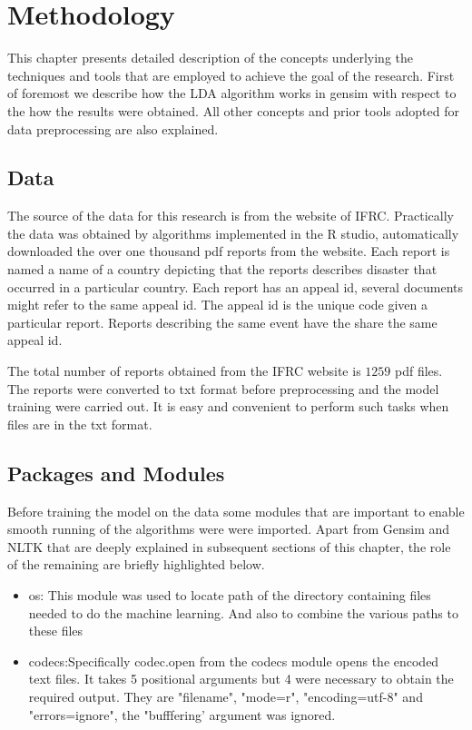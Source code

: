 \chapter{Methodology}
This chapter presents detailed description  of the concepts underlying the techniques and tools that are employed to achieve the goal of the research. First of foremost we describe how the LDA algorithm works in gensim with respect to the how the results were obtained. All other concepts and prior tools adopted for data preprocessing are also explained.

\section{Data}
\begin{flushleft}
The source of the data for this research is from the website of IFRC. Practically the data was obtained by algorithms implemented in the R studio, automatically downloaded the over one thousand pdf reports from the website. Each report is named a name of a country depicting that the reports describes disaster that occurred in a particular country. Each report has an appeal id, several documents might refer to the same appeal id. The appeal id is the unique code given a particular report. Reports describing the same event have the share the same appeal id.
\end{flushleft}

The total number of reports obtained from the IFRC website is $1259$ pdf files. The reports were converted to txt format before preprocessing and the model training were carried out. It is easy and convenient to perform  such tasks when files are in the txt format.

\section{Packages and Modules}
Before training the model on the data some modules that are important to enable smooth running of the algorithms were were imported. Apart from Gensim and NLTK that are deeply explained in subsequent sections of this chapter, the role of  the remaining are briefly highlighted below.
\begin{itemize}
\item os: This module was used to locate path of the directory containing files needed to do the machine learning. And also to combine the various paths to these files
\item codecs:Specifically codec.open from the codecs module opens  the encoded text files. It takes 5 positional arguments but 4 were necessary to obtain the required output. They are "filename", "mode=r", "encoding=utf-8" and "errors=ignore", the "bufffering' argument was ignored.
\end{itemize} 

